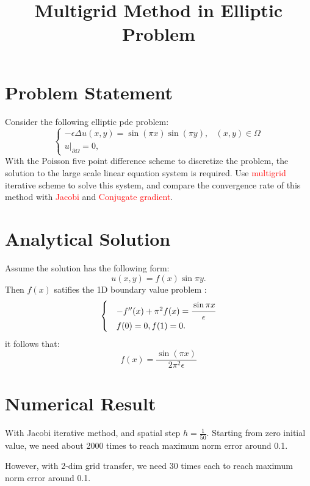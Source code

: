 \documentclass[12pt]{article}
\begin{document}
\title{Multigrid Method in Elliptic Problem}
\maketitle
\section{Problem Statement}
Consider the following elliptic pde problem:
\begin{equation}
\begin{cases}
-\epsilon \Delta u(x,y)=\sin(\pi x)\sin(\pi y),&(x,y)\in \Omega\\
u|_{\partial \Omega}=0,&
\end{cases}
\end{equation}
With the Poisson five point difference scheme to discretize the problem, the solution to the large scale linear equation system is required. Use \textcolor{red}{multigrid} iterative scheme to solve this system, and compare the convergence rate of this method with \textcolor{red}{Jacobi} and \textcolor{red}{Conjugate gradient}.
\section{Analytical Solution}
Assume the solution has the following form:
\begin{equation}\label{eq:fx}
u(x,y)=f(x)\sin \pi y.
\end{equation}
Then $f(x)$ satifies the 1D boundary value problem :
\begin{equation}\label{eq:2b}
\begin{cases}
&- f''(x)+\pi^2 f(x)=\cfrac{\sin \pi x}{\epsilon}\\
&f(0)=0,f(1)=0.
\end{cases}
\end{equation}
it follows that:
\begin{equation}
f(x)=\frac{\sin (\pi  x)}{2 \pi ^2 \epsilon}
\end{equation}
\section{Numerical Result}
With Jacobi iterative method, and spatial step $h=\frac{1}{50}$.
Starting from zero initial value, we need about 2000 times to reach maximum norm error around 0.1. 

However, with 2-dim grid transfer, we need 30 times each to reach maximum norm error around 0.1. 
\end{document}
